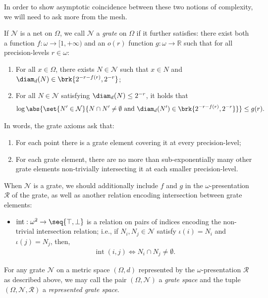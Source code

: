 In order to show asymptotic coincidence between these two notions of complexity, we will need to ask more from the mesh.

\begin{definition}
    If $\mathcal{N}$ is a net on $\Omega$, we call $\mathcal{N}$ a \textit{grate} on $\Omega$ if it further satisfies: there exist both a function $f : \omega \to [1, +\infty)$ and an $o(r)$ function $g: \omega \to \mathbb{R}$ such that for all precision-levels $r \in \omega$:
    \begin{enumerate}[label=(\roman*)]
        \item[(\textbf{G5})] For all $x \in \Omega$, there exists $N \in \mathcal{N}$ such that $x \in N$ and $\diam_d(N) \in \brk{2^{-r - f(r)}, 2^{-r}}$;
        \item[(\textbf{G6})] For all $N \in \mathcal{N}$ satisfying $\diam_d(N) \leq 2^{-r}$, it holds that
        \begin{align*}
            \log \abs{\set{N' \in \mathcal{N}}{N \cap N' \neq \emptyset \text{ and } \diam_d(N') \in \brk{2^{-r - f(r)}, 2^{-r}}}} \leq g(r).
        \end{align*}
    \end{enumerate}
    In words, the grate axioms ask that:
    \begin{enumerate}[label=(\roman*)]
        \item[(\textbf{G5})] For each point there is a grate element covering it at every precision-level;
        \item[(\textbf{G6})] For each grate element, there are no more than sub-exponentially many other grate elements non-trivially intersecting it at each smaller precision-level. 
    \end{enumerate}
\end{definition}

When $\mathcal{N}$ is a grate, we should additionally include $f$ and $g$ in the $\omega$-presentation $\mathscr{R}$ of the grate, as well as another relation encoding intersection between grate elements:
\begin{itemize}
    \item $\operatorname{int}: \omega^2 \to \seq{\top, \bot}$ is a relation on pairs of indices encoding the non-trivial intersection relation; i.e., if $N_i, N_j \in \mathcal{N}$ satisfy $\iota(i) = N_i$ and $\iota(j) = N_j$, then,
    \begin{align*}
        \operatorname{int}(i, j) \iff N_i \cap N_j \neq \emptyset.
    \end{align*}
\end{itemize}
For any grate $\mathcal{N}$ on a metric space $(\Omega, d)$ represented by the $\omega$-presentation $\mathscr{R}$ as described above, we may call the pair $(\Omega, \mathcal{N})$ a \textit{grate space} and the tuple $(\Omega, \mathcal{N}, \mathscr{R})$ a \textit{represented grate space}.

